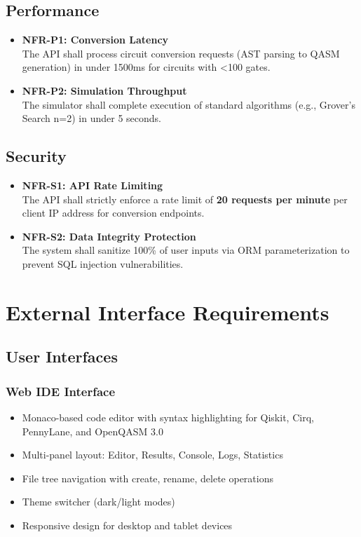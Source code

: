 \subsection{Performance}
\begin{itemize}
    \item \textbf{NFR-P1: Conversion Latency} \\
    The API shall process circuit conversion requests (AST parsing to QASM generation) in under 1500ms for circuits with <100 gates.
    \item \textbf{NFR-P2: Simulation Throughput} \\
    The simulator shall complete execution of standard algorithms (e.g., Grover's Search n=2) in under 5 seconds.
\end{itemize}

\subsection{Security}
\begin{itemize}
    \item \textbf{NFR-S1: API Rate Limiting} \\
    The API shall strictly enforce a rate limit of \textbf{20 requests per minute} per client IP address for conversion endpoints.
    \item \textbf{NFR-S2: Data Integrity Protection} \\
    The system shall sanitize 100\% of user inputs via ORM parameterization to prevent SQL injection vulnerabilities.
\end{itemize}

\clearpage
\section{External Interface Requirements}

\subsection{User Interfaces}

\subsubsection{Web IDE Interface}
\begin{itemize}
    \item Monaco-based code editor with syntax highlighting for Qiskit, Cirq, PennyLane, and OpenQASM 3.0
    \item Multi-panel layout: Editor, Results, Console, Logs, Statistics
    \item File tree navigation with create, rename, delete operations
    \item Theme switcher (dark/light modes)
    \item Responsive design for desktop and tablet devices
\end{itemize}

